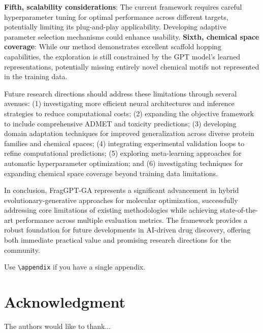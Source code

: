 \documentclass[lettersize,journal]{IEEEtran}
\begin{document}
\textbf{Fifth, scalability considerations}: The current framework requires careful hyperparameter tuning for optimal performance across different targets, potentially limiting its plug-and-play applicability. Developing adaptive parameter selection mechanisms could enhance usability. \textbf{Sixth, chemical space coverage}: While our method demonstrates excellent scaffold hopping capabilities, the exploration is still constrained by the GPT model's learned representations, potentially missing entirely novel chemical motifs not represented in the training data.

Future research directions should address these limitations through several avenues: (1) investigating more efficient neural architectures and inference strategies to reduce computational costs; (2) expanding the objective framework to include comprehensive ADMET and toxicity predictions; (3) developing domain adaptation techniques for improved generalization across diverse protein families and chemical spaces; (4) integrating experimental validation loops to refine computational predictions; (5) exploring meta-learning approaches for automatic hyperparameter optimization; and (6) investigating techniques for expanding chemical space coverage beyond training data limitations.

In conclusion, FragGPT-GA represents a significant advancement in hybrid evolutionary-generative approaches for molecular optimization, successfully addressing core limitations of existing methodologies while achieving state-of-the-art performance across multiple evaluation metrics. The framework provides a robust foundation for future developments in AI-driven drug discovery, offering both immediate practical value and promising research directions for the community.


Use \verb|\appendix| if you have a single appendix.

\section*{Acknowledgment}
The authors would like to thank...

\balance

\nocite{*} %


\end{document}
